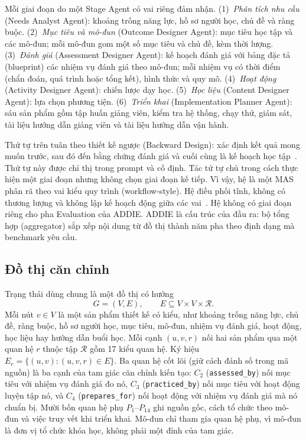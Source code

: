 \documentclass[conference,a4paper]{IEEEtran}
\begin{document}
Mỗi giai đoạn do một Stage Agent có vai riêng đảm nhận.
(1)~\emph{Phân tích nhu cầu} (Needs Analyst Agent): khoảng trống năng lực, hồ sơ người học, chủ đề và
ràng buộc. (2)~\emph{Mục tiêu và mô-đun} (Outcome Designer Agent): mục tiêu học tập và các mô-đun; mỗi mô-đun gom một số mục tiêu và chủ đề, kèm thời lượng. (3)~\emph{Đánh giá} (Assessment Designer Agent): kế
hoạch đánh giá với bảng đặc tả (blueprint) các nhiệm vụ đánh giá theo mô-đun;
mỗi nhiệm vụ có thời điểm (chẩn đoán, quá trình hoặc tổng kết), hình thức và quy
mô. (4)~\emph{Hoạt động} (Activity Designer Agent): chiến lược dạy học. (5)~\emph{Học liệu} (Content Designer Agent): lựa chọn
phương tiện. (6)~\emph{Triển khai} (Implementation Planner Agent): sáu sản phẩm gồm tập huấn giảng viên, kiểm
tra hệ thống, chạy thử, giám sát, tài liệu hướng dẫn giảng viên và tài liệu hướng
dẫn vận hành.

Thứ tự trên tuân theo thiết kế ngược (Backward Design): xác định kết quả mong
muốn trước, sau đó đến bằng chứng đánh giá và cuối cùng là kế hoạch học
tập~\cite{wiggins2005ubd}. Thứ tự này được chỉ thị trong prompt và cố định. Tác
tử tự chủ trong cách thực hiện một giai đoạn nhưng không chọn giai đoạn kế tiếp.
Vì vậy, hệ là một MAS phân rã theo vai kiểu quy trình (workflow-style). Hệ điều
phối tĩnh, không có thương lượng và không lập kế hoạch động giữa các
vai~\cite{hong2024metagpt}. Hệ không có giai đoạn riêng cho pha Evaluation của ADDIE. ADDIE là cấu
trúc của đầu ra: bộ tổng hợp (aggregator) sắp xếp nội dung từ đồ thị thành năm
pha theo định dạng mà benchmark yêu cầu.

\subsection{Đồ thị căn chỉnh}
\label{sec:graph}

Trạng thái dùng chung là một đồ thị có hướng
\begin{equation}
\label{eq:graph}
G=(V,E),\qquad E\subseteq V\times V\times\mathcal{R}.
\end{equation}
Mỗi nút $v\in V$ là một sản phẩm thiết kế có kiểu, như khoảng trống năng lực, chủ
đề, ràng buộc, hồ sơ người học, mục tiêu, mô-đun, nhiệm vụ đánh giá, hoạt động,
học liệu hay hướng dẫn buổi học. Mỗi cạnh $(u,v,r)$ nối hai sản phẩm qua một quan hệ $r$
thuộc tập $\mathcal{R}$ gồm 17 kiểu quan hệ. Ký hiệu $E_r=\{(u,v)\colon(u,v,r)\in E\}$.
Ba quan hệ cốt lõi (giữ cách đánh số trong mã nguồn) là ba cạnh của tam giác căn chỉnh kiến tạo: $C_2$
(\texttt{assessed\_by}) nối mục tiêu với nhiệm vụ đánh giá đo nó, $C_3$
(\texttt{practiced\_by}) nối mục tiêu với hoạt động luyện tập nó, và $C_4$
(\texttt{prepares\_for}) nối hoạt động với nhiệm vụ đánh giá mà nó chuẩn bị. Mười
bốn quan hệ phụ $P_1$--$P_{14}$ ghi nguồn gốc, cách tổ chức theo mô-đun và việc
truy vết khi triển khai. Mô-đun
chỉ tham gia quan hệ phụ, vì mô-đun là đơn vị tổ chức khóa học, không phải một đỉnh của tam
giác.
\end{document}
